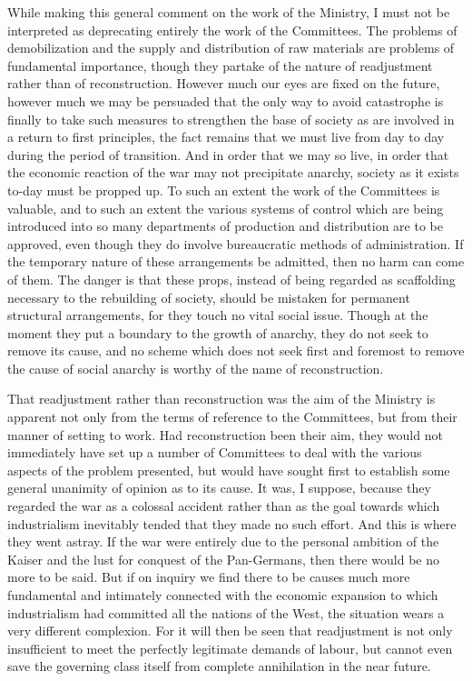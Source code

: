 \documentclass{book}
\begin{document}
While making this general comment on the work of the Ministry, I must not be interpreted as deprecating entirely the work of the Committees. The problems of demobilization and the supply and distribution of raw materials are problems of fundamental importance, though they partake of the nature of readjustment rather than of reconstruction. However much our eyes are fixed on the future, however much we may be persuaded that the only way to avoid catastrophe is finally to take such measures to strengthen the base of society as are involved in a return to first principles, the fact remains that we must live from day to day during the period of transition. And in order that we may so live, in order that the economic reaction of the war may not precipitate anarchy, society as it exists to-day must be propped up. To such an extent the work of the Committees is valuable, and to such an extent the various systems of control which are being introduced into so many departments of production and distribution are to be approved, even though they do involve bureaucratic methods of administration. If the temporary nature of these arrangements be admitted, then no harm can come of them. The danger is that these props, instead of being regarded as scaffolding necessary to the rebuilding of society, should be mistaken for permanent structural arrangements, for they touch no vital social issue. Though at the moment they put a boundary to the growth of anarchy, they do not seek to remove its cause, and no scheme which does not seek first and foremost to remove the cause of social anarchy is worthy of the name of reconstruction.

That readjustment rather than reconstruction was the aim of the Ministry is apparent not only from the terms of reference to the Committees, but from their manner of setting to work. Had reconstruction been their aim, they would not immediately have set up a number of Committees to deal with the various aspects of the problem presented, but would have sought first to establish some general unanimity of opinion as to its cause. It was, I suppose, because they regarded the war as a colossal accident rather than as the goal towards which industrialism inevitably tended that they made no such effort. And this is where they went astray. If the war were entirely due to the personal ambition of the Kaiser and the lust for conquest of the Pan-Germans, then there would be no more to be said. But if on inquiry we find there to be causes much more fundamental and intimately connected with the economic expansion to which industrialism had committed all the nations of the West, the situation wears a very different complexion. For it will then be seen that readjustment is not only insufficient to meet the perfectly legitimate demands of labour, but cannot even save the governing class itself from complete annihilation in the near future.
\end{document}
